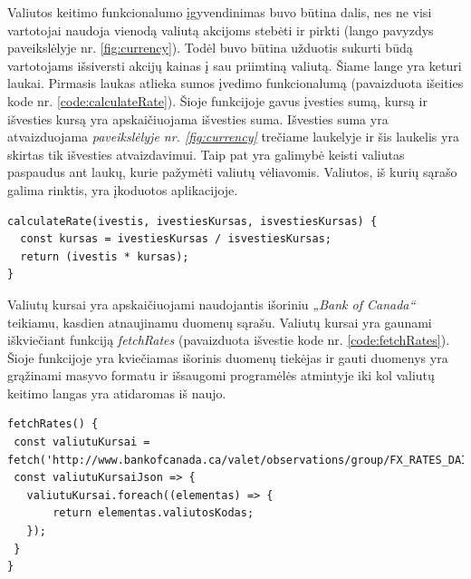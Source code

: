 \documentclass[a4paper,12pt,fleqn]{article}
\begin{document}
Valiutos keitimo funkcionalumo įgyvendinimas buvo būtina dalis, nes ne visi vartotojai naudoja vienodą valiutą akcijoms stebėti ir pirkti (lango pavyzdys paveikslėlyje nr. \ref{fig:currency}). Todėl buvo būtina užduotis sukurti būdą vartotojams išsiversti akcijų kainas į sau priimtiną valiutą. Šiame lange yra keturi laukai. Pirmasis laukas atlieka sumos įvedimo funkcionalumą (pavaizduota išeities kode nr. \ref{code:calculateRate}). Šioje funkcijoje gavus įvesties sumą, kursą ir išvesties kursą yra apskaičiuojama išvesties suma. Išvesties suma yra atvaizduojama \textit{paveikslėlyje nr. \ref{fig:currency}} trečiame laukelyje ir šis laukelis yra skirtas tik išvesties atvaizdavimui. Taip pat yra galimybė keisti valiutas paspaudus ant laukų, kurie pažymėti valiutų vėliavomis. Valiutos, iš kurių sąrašo galima rinktis, yra įkoduotos aplikacijoje.

\begin{lstlisting}[caption={Funkcijos calculateRate() pseudokodas.},label={code:calculateRate}]
calculateRate(ivestis, ivestiesKursas, isvestiesKursas) {
  const kursas = ivestiesKursas / isvestiesKursas;
  return (ivestis * kursas);
}
\end{lstlisting}

Valiutų kursai yra apskaičiuojami naudojantis išoriniu \textit{„Bank of Canada“} teikiamu, kasdien atnaujinamu duomenų sąrašu. Valiutų kursai yra gaunami iškviečiant funkciją \textit{fetchRates} (pavaizduota išvestie kode nr. \ref{code:fetchRates}). Šioje funkcijoje yra kviečiamas išorinis duomenų tiekėjas ir gauti duomenys yra grąžinami masyvo formatu ir išsaugomi programėlės atmintyje iki kol valiutų keitimo langas yra atidaromas iš naujo.

\begin{lstlisting}[caption={Funkcijos fetchRates() pseudokodas.},label={code:fetchRates}]
fetchRates() {
 const valiutuKursai = fetch('http://www.bankofcanada.ca/valet/observations/group/FX_RATES_DAILY');
 const valiutuKursaiJson => {
   valiutuKursai.foreach((elementas) => {
	   return elementas.valiutosKodas;
   });
 }
}
\end{lstlisting}




\newpage
\end{document}
